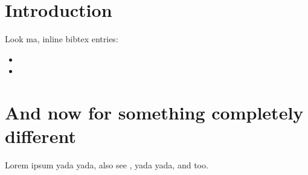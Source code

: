 \documentclass{article}
\begin{document}
\section{Introduction}

Look ma, inline bibtex entries:

\begin{itemize}
\item {}
\item {}
\end{itemize}

\section{And now for something completely different}
Lorem ipsum yada yada,
also see \cite{wehrens2018a}, 
yada yada, and \cite{wehrens2014} too.



\end{document}
